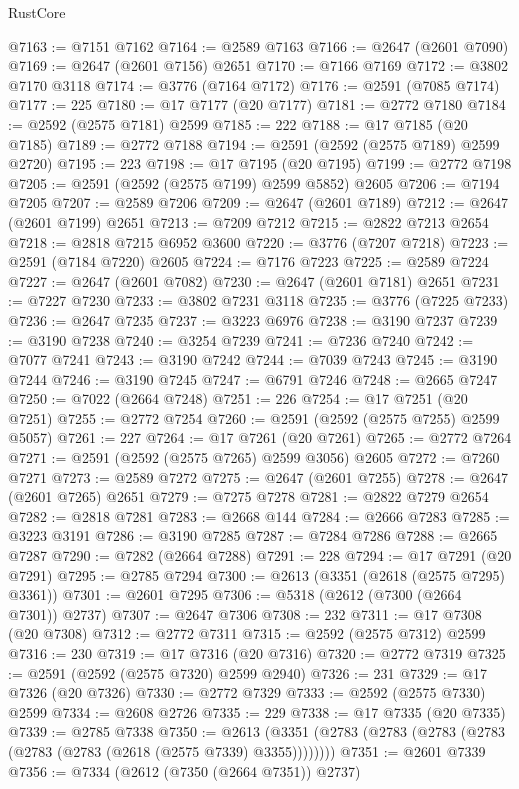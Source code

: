 \begin{lexlean}{RustCore}
\begin{coremodule}
@7163 := @7151 @7162
@7164 := @2589 @7163
@7166 := @2647 (@2601 @7090)
@7169 := @2647 (@2601 @7156) @2651
@7170 := @7166 @7169
@7172 := @3802 @7170 @3118
@7174 := @3776 (@7164 @7172)
@7176 := @2591 (@7085 @7174)
@7177 := 225
@7180 := @17 @7177 (@20 @7177)
@7181 := @2772 @7180
@7184 := @2592 (@2575 @7181) @2599
@7185 := 222
@7188 := @17 @7185 (@20 @7185)
@7189 := @2772 @7188
@7194 := @2591 (@2592 (@2575 @7189) @2599 @2720)
@7195 := 223
@7198 := @17 @7195 (@20 @7195)
@7199 := @2772 @7198
@7205 := @2591 (@2592 (@2575 @7199) @2599 @5852) @2605
@7206 := @7194 @7205
@7207 := @2589 @7206
@7209 := @2647 (@2601 @7189)
@7212 := @2647 (@2601 @7199) @2651
@7213 := @7209 @7212
@7215 := @2822 @7213 @2654
@7218 := @2818 @7215 @6952 @3600
@7220 := @3776 (@7207 @7218)
@7223 := @2591 (@7184 @7220) @2605
@7224 := @7176 @7223
@7225 := @2589 @7224
@7227 := @2647 (@2601 @7082)
@7230 := @2647 (@2601 @7181) @2651
@7231 := @7227 @7230
@7233 := @3802 @7231 @3118
@7235 := @3776 (@7225 @7233)
@7236 := @2647 @7235
@7237 := @3223 @6976
@7238 := @3190 @7237
@7239 := @3190 @7238
@7240 := @3254 @7239
@7241 := @7236 @7240
@7242 := @7077 @7241
@7243 := @3190 @7242
@7244 := @7039 @7243
@7245 := @3190 @7244
@7246 := @3190 @7245
@7247 := @6791 @7246
@7248 := @2665 @7247
@7250 := @7022 (@2664 @7248)
@7251 := 226
@7254 := @17 @7251 (@20 @7251)
@7255 := @2772 @7254
@7260 := @2591 (@2592 (@2575 @7255) @2599 @5057)
@7261 := 227
@7264 := @17 @7261 (@20 @7261)
@7265 := @2772 @7264
@7271 := @2591 (@2592 (@2575 @7265) @2599 @3056) @2605
@7272 := @7260 @7271
@7273 := @2589 @7272
@7275 := @2647 (@2601 @7255)
@7278 := @2647 (@2601 @7265) @2651
@7279 := @7275 @7278
@7281 := @2822 @7279 @2654
@7282 := @2818 @7281
@7283 := @2668 @144
@7284 := @2666 @7283
@7285 := @3223 @3191
@7286 := @3190 @7285
@7287 := @7284 @7286
@7288 := @2665 @7287
@7290 := @7282 (@2664 @7288)
@7291 := 228
@7294 := @17 @7291 (@20 @7291)
@7295 := @2785 @7294
@7300 := @2613 (@3351 (@2618 (@2575 @7295) @3361))
@7301 := @2601 @7295
@7306 := @5318 (@2612 (@7300 (@2664 @7301)) @2737)
@7307 := @2647 @7306
@7308 := 232
@7311 := @17 @7308 (@20 @7308)
@7312 := @2772 @7311
@7315 := @2592 (@2575 @7312) @2599
@7316 := 230
@7319 := @17 @7316 (@20 @7316)
@7320 := @2772 @7319
@7325 := @2591 (@2592 (@2575 @7320) @2599 @2940)
@7326 := 231
@7329 := @17 @7326 (@20 @7326)
@7330 := @2772 @7329
@7333 := @2592 (@2575 @7330) @2599
@7334 := @2608 @2726
@7335 := 229
@7338 := @17 @7335 (@20 @7335)
@7339 := @2785 @7338
@7350 := @2613 (@3351 (@2783 (@2783 (@2783 (@2783 (@2783 (@2783 (@2618 (@2575 @7339) @3355))))))))
@7351 := @2601 @7339
@7356 := @7334 (@2612 (@7350 (@2664 @7351)) @2737)

\end{coremodule}
\end{lexlean}
